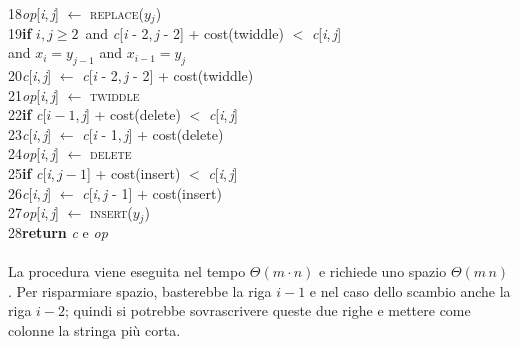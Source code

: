 \documentclass[10pt, a4paper]{report}
\newcommand\firsttab[1][0.5cm]{\hspace*{#1}}
\newcommand\thirdtab[1][1.5cm]{\hspace*{#1}}
\newcommand\fourthtab[1][2cm]{\hspace*{#1}}
\begin{document}
18\fourthtab\textit{op}[\textit{i},\,\textit{j}] $\leftarrow$ \textsc{replace($y_j$)}\\
19\thirdtab\textbf{if} $i,j \geq 2$ \,and \textit{c}[\textit{i} - 2,\,\textit{j} - 2] + cost(twiddle) $<$ \textit{c}[\textit{i},\,\textit{j}]\\
\fourthtab\thirdtab and $x_i = y_{j-1}$ and $x_{i-1} = y_j$\\
20\fourthtab\textit{c}[\textit{i},\,\textit{j}] $\leftarrow$ \textit{c}[\textit{i} - 2,\,\textit{j} - 2] + cost(twiddle)\\
21\fourthtab\textit{op}[\textit{i},\,\textit{j}] $\leftarrow$ \textsc{twiddle}\\
22\thirdtab\textbf{if} \textit{c}[$i - 1$,\,\textit{j}] + cost(delete) $<$ \textit{c}[\textit{i},\,\textit{j}]\\
23\fourthtab\textit{c}[\textit{i},\,\textit{j}] $\leftarrow$ \textit{c}[\textit{i} - 1,\,\textit{j}] + cost(delete)\\
24\fourthtab\textit{op}[\textit{i},\,\textit{j}] $\leftarrow$ \textsc{delete}\\
25\thirdtab\textbf{if} \textit{c}[\textit{i},\,$j - 1$] + cost(insert) $<$ \textit{c}[\textit{i},\,\textit{j}]\\
26\fourthtab\textit{c}[\textit{i},\,\textit{j}] $\leftarrow$ \textit{c}[\textit{i},\,\textit{j} - 1] + cost(insert)\\
27\fourthtab\textit{op}[\textit{i},\,\textit{j}] $\leftarrow$ \textsc{insert($y_j$)}\\
28\firsttab\textbf{return} \textit{c} e \textit{op}\\\\
La procedura viene eseguita nel tempo $\Theta(m\cdot n)$ e richiede uno spazio $\Theta(m\,n)$. Per risparmiare spazio, basterebbe la riga $i - 1$ e nel caso dello scambio anche la riga $i - 2$; quindi si potrebbe sovrascrivere queste due righe e mettere come colonne la stringa più corta.
\end{document}
